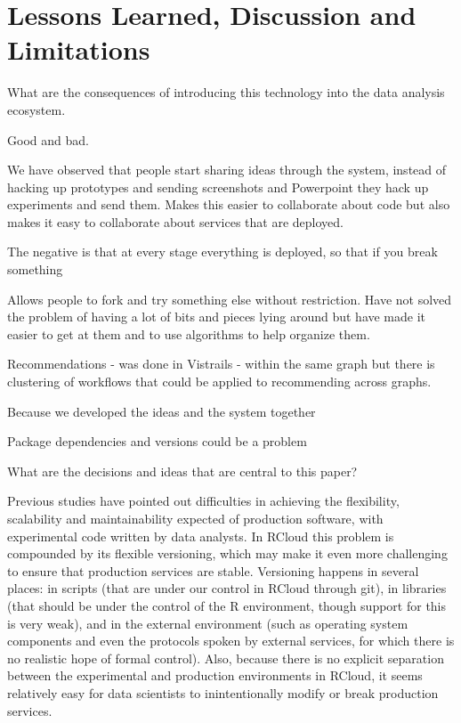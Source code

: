 \section{Lessons Learned, Discussion and Limitations}

What are the consequences of introducing this technology into the
data analysis ecosystem. 


Good and bad.

We have observed that people start sharing ideas through the system,
instead of hacking up prototypes and sending screenshots and Powerpoint
they hack up experiments and send them. Makes this easier to collaborate
about code but also makes it easy to collaborate about services that are
deployed.

The negative is that at every stage everything is deployed, so that if
you break something

Allows people to fork and try something else without restriction.
Have not solved the problem of having a lot of bits and pieces lying around
but have made it easier to get at them and to use algorithms to 
help organize them.

Recommendations - was done in Vistrails - within the same graph but
there is clustering of workflows that could be applied to recommending
across graphs.

Because we developed the ideas and the system together 

Package dependencies and versions could be a problem


What are the decisions and ideas that are central to this paper?

Previous studies have pointed out difficulties in achieving the flexibility,
scalability and maintainability expected of production software,
with experimental code written by data analysts. In RCloud this problem
is compounded by its flexible versioning, which may make it even
more challenging to ensure that production services are stable.
Versioning happens in several places: in scripts (that are under
our control in RCloud through git), in libraries (that should be
under the control of the R environment, though support for this
is very weak), and in the external environment
(such as operating system components and even the protocols
spoken by external services, for which there is no realistic
hope of formal control).  
Also, because there is no explicit separation between the experimental
and production environments in RCloud, it seems relatively easy for
data scientists to inintentionally modify or break production services.

